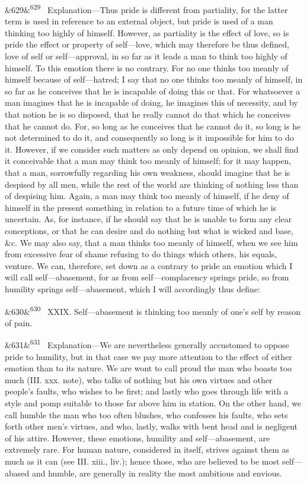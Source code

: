 \documentclass[12pt]{article}
\newcommand{\para}[1][]{\par\noindent\ifx&#1&\else\textsuperscript{\footnotesize #1}~\fi}
\begin{document}
\para[629] Explanation---Thus pride is different from partiality, for the latter term is used in reference to an external object, but pride is used of a man thinking too highly of himself. However, as partiality is the effect of love, so is pride the effect or property of self---love, which may therefore be thus defined, love of self or self---approval, in so far as it leads a man to think too highly of himself. To this emotion there is no contrary. For no one thinks too meanly of himself because of self---hatred; I say that no one thinks too meanly of himself, in so far as he conceives that he is incapable of doing this or that. For whatsoever a man imagines that he is incapable of doing, he imagines this of necessity, and by that notion he is so disposed, that he really cannot do that which he conceives that he cannot do. For, so long as he conceives that he cannot do it, so long is he not determined to do it, and consequently so long is it impossible for him to do it. However, if we consider such matters as only depend on opinion, we shall find it conceivable that a man may think too meanly of himself; for it may happen, that a man, sorrowfully regarding his own weakness, should imagine that he is despised by all men, while the rest of the world are thinking of nothing less than of despising him. Again, a man may think too meanly of himself, if he deny of himself in the present something in relation to a future time of which he is uncertain. As, for instance, if he should say that he is unable to form any clear conceptions, or that he can desire and do nothing but what is wicked and base, \&c. We may also say, that a man thinks too meanly of himself, when we see him from excessive fear of shame refusing to do things which others, his equals, venture. We can, therefore, set down as a contrary to pride an emotion which I will call self---abasement, for as from self---complacency springs pride, so from humility springs self---abasement, which I will accordingly thus define:

\para[630] XXIX. Self---abasement is thinking too meanly of one's self by reason of pain.

\para[631] Explanation---We are nevertheless generally accustomed to oppose pride to humility, but in that case we pay more attention to the effect of either emotion than to its nature. We are wont to call proud the man who boasts too much (III. xxx. note), who talks of nothing but his own virtues and other people's faults, who wishes to be first; and lastly who goes through life with a style and pomp suitable to those far above him in station. On the other hand, we call humble the man who too often blushes, who confesses his faults, who sets forth other men's virtues, and who, lastly, walks with bent head and is negligent of his attire. However, these emotions, humility and self---abasement, are extremely rare. For human nature, considered in itself, strives against them as much as it can (see III. xiii., liv.); hence those, who are believed to be most self---abased and humble, are generally in reality the most ambitious and envious.
\end{document}
